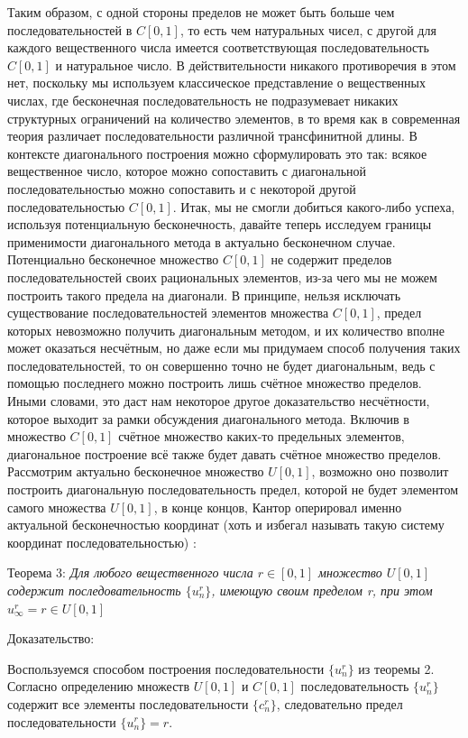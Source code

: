 \documentclass[12pt]{article}
\begin{document}
Таким образом, с одной стороны пределов не может быть больше чем последовательностей в $C[0, 1]$, то есть чем натуральных чисел, с другой для каждого вещественного числа имеется соответствующая последовательность $C[0, 1]$ и натуральное число. В действительности никакого противоречия в этом нет, поскольку мы используем классическое представление о вещественных числах, где бесконечная последовательность не подразумевает никаких структурных ограничений на количество элементов, в то время как в современная теория различает последовательности различной трансфинитной длины. В контексте диагонального построения можно сформулировать это так: всякое вещественное число, которое можно сопоставить с диагональной последовательностью можно сопоставить и с некоторой другой последовательностью $C[0, 1]$. Итак, мы не смогли добиться какого-либо успеха, используя потенциальную бесконечность, давайте теперь исследуем границы применимости диагонального метода в актуально бесконечном случае. Потенциально бесконечное множество $C[0, 1]$ не содержит пределов последовательностей своих рациональных элементов, из-за чего мы не можем построить такого предела на диагонали. В принципе, нельзя исключать существование последовательностей элементов множества $C[0, 1]$, предел которых невозможно получить диагональным методом, и их количество вполне может оказаться несчётным, но даже если мы придумаем способ получения таких последовательностей, то он совершенно точно не будет диагональным, ведь с помощью последнего можно построить лишь счётное множество пределов. Иными словами, это даст нам некоторое другое доказательство несчётности, которое выходит за рамки обсуждения диагонального метода. Включив в множество $C[0, 1]$ счётное множество каких-то предельных элементов, диагональное построение всё также будет давать счётное множество пределов. Рассмотрим актуально бесконечное множество $U[0, 1]$, возможно оно позволит построить диагональную последовательность предел, которой не будет элементом самого множества $U[0, 1]$, в конце концов, Кантор оперировал именно актуальной бесконечностью координат (хоть и избегал называть такую систему координат последовательностью) \cite{diagonal}:

Теорема 3: {\sl Для любого вещественного числа $r \in [0, 1]$ множество $U[0, 1]$ содержит последовательность $\{u^r_n\}$, имеющую своим пределом r, при этом $u^r_{\infty} = r \in U[0, 1]$}

Доказательство:

Воспользуемся способом построения последовательности $\{u^r_n\}$ из теоремы 2. Согласно определению множеств $U[0, 1]$ и $C[0, 1]$ последовательность $\{u^r_n\}$ содержит все элементы последовательности $\{c^r_n\}$, следовательно предел последовательности $\{u^r_n\} = r$.
\end{document}
